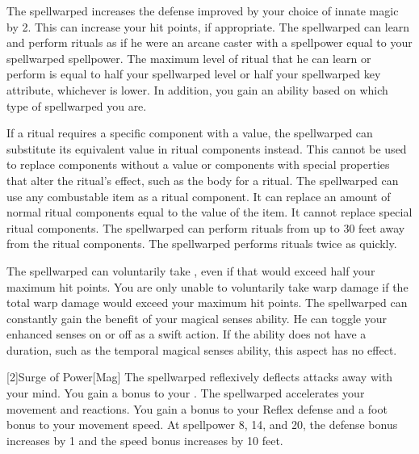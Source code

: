         The spellwarped increases the defense improved by your choice of innate magic by 2.
        This can increase your hit points, if appropriate.
         The spellwarped can learn and perform rituals as if he were an arcane caster with a spellpower equal to your spellwarped spellpower.  The maximum level of ritual that he can learn or perform is equal to half your spellwarped level or half your spellwarped key attribute, whichever is lower.
        In addition, you gain an ability based on which type of spellwarped you are.
        \begin{itemize}
             If a ritual requires a specific component with a value, the spellwarped can substitute its equivalent value in ritual components instead.
                This cannot be used to replace components without a value or components with special properties that alter the ritual's effect, such as the body for a  ritual.
                The spellwarped can use any combustable item as a ritual component.
                It can replace an amount of normal ritual components equal to the value of the item.
                It cannot replace special ritual components.
                The spellwarped can perform rituals from up to 30 feet away from the ritual components.
                The spellwarped performs rituals twice as quickly.
        \end{itemize}
        The spellwarped can voluntarily take , even if that would exceed half your maximum hit points.
        You are only unable to voluntarily take warp damage if the total warp damage would exceed your maximum hit points.
        The spellwarped can constantly gain the benefit of your magical senses ability.
        He can toggle your enhanced senses on or off as a swift action.
        If the ability does not have a duration, such as the temporal magical senses ability, this aspect has no effect.

        [2]{Surge of Power}[Mag]
        The spellwarped reflexively deflects attacks away with your mind.
        You gain a  bonus to your .
        The spellwarped accelerates your movement and reactions.
        You gain a  bonus to your Reflex defense and a  foot bonus to your movement speed.
        At spellpower 8, 14, and 20, the defense bonus increases by 1 and the speed bonus increases by 10 feet.

